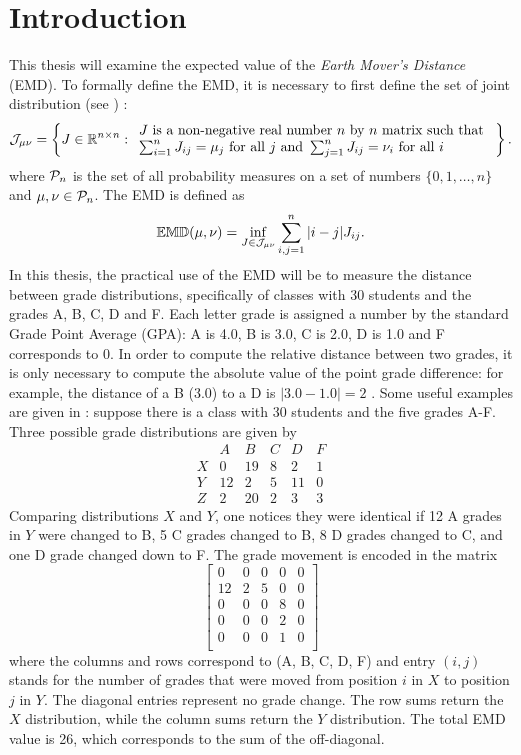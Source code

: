 \documentclass[12pt,letterpaper,oneside,openany]{book}
\begin{document}
\chapter{Introduction}
This thesis will examine the expected value of the \emph{Earth Mover's Distance} (EMD).  To formally define the EMD, it is necessary to first define the set of joint distribution (see \cite{bourn2019expected}) :
\[
{\mathcal{J}}_{\mu \nu} = \left\{ J \in {\mathbb{R}}^{n \times n} :
\begin{array}{l}
J \mbox{ is a non-negative real number $n$ by $n$ matrix such that } \\
\sum_{i=1}^n J_{ij} = \mu_j \mbox{ for all } j  \mbox{ and }
\sum_{j=1}^n J_{ij} = \nu_i \mbox{ for all } i
\end{array}
\right\}.
\]
where ${\mathcal{P}}_n$ is the set of all probability measures on a set of numbers $\{0, 1, …, n\}$ and $\mu, \nu \in {\mathcal{P}}_n$.
The EMD is defined as
\[
{\mathbb{EMD}}(\mu, \nu) = \inf_{J \in {\mathcal{J}}_{\mu \nu}} \sum_{i,j = 1}^n |i-j| J_{ij}.
\]
In this thesis, the practical use of the EMD will be to measure the distance between grade distributions, specifically of classes with 30 students and the grades A, B, C, D and F. Each letter grade is assigned a number by the standard Grade Point Average (GPA): A is 4.0, B is  3.0, C is 2.0, D is 1.0 and F corresponds to 0.
In order to compute the relative distance between two grades, it is only necessary to compute the absolute value of the point grade difference: for example, the distance of a B (3.0) to a D is $|3.0-1.0|=2$ .
Some useful examples are given in \cite{bourn2019expected}: suppose there is a class with 30 students and the five grades A-F. Three possible grade distributions are given by 
\[
\begin{array}{c|ccccc}
&  A &  B &  C &  D &  F \\ \hline
X &  0 & 19 &  8 &  2 &  1 \\
Y & 12 &  2 &  5 & 11 &  0 \\
Z &  2 & 20 &  2 &  3 &  3
\end{array}
\]
Comparing distributions $X$ and $Y$, one notices they were identical if  12 A grades in $Y$ were changed to B, 5 C grades changed to B, 8 D grades  changed to C, and one D grade changed down to F. The grade movement is encoded in the matrix
\[
\left[
\begin{array}{ccccc}
0 & 0 & 0 & 0 & 0 \\
12 & 2 & 5 & 0 & 0 \\
0 & 0 & 0 & 8 & 0 \\
0 & 0 & 0 & 2 & 0 \\
0 & 0 & 0 & 1 & 0 \\
\end{array}
\right]
\]
where the columns and rows correspond to (A, B, C, D, F) and entry $(i,j)$ stands for the number of grades that were moved from position $i$ in $X$ to position $j$ in $Y$. The diagonal entries represent no grade change. The row sums return the $X$ distribution, while the column sums return the $Y$ distribution. The total EMD value is 26, which corresponds to the sum of the off-diagonal.
\end{document}
